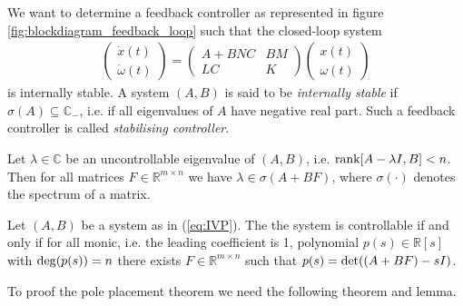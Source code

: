We want to determine a feedback controller as represented in figure \ref{fig:blockdiagram_feedback_loop} such that the closed-loop system
\begin{align*}
	\begin{pmatrix}
	\dot{x}(t) \\
	\dot{\omega}(t)
	\end{pmatrix} =
	\begin{pmatrix}
	A+BNC & BM \\
	LC & K
	\end{pmatrix}
	\begin{pmatrix}
	x(t) \\
	\omega(t)
	\end{pmatrix}
\end{align*}
is internally stable. A system $(A,B)$ is said to be \emph{internally stable} if $\sigma(A) \subseteq \mathbb{C}_-$, i.e. if all eigenvalues of $A$ have negative real part. Such a feedback controller is called \emph{stabilising controller}. 
\begin{mylem}\label{lem:9.1}
	Let $\lambda\in\mathbb{C}$ be an uncontrollable eigenvalue of $(A,B)$, i.e. $\operatorname{rank}[A-\lambda I, B] < n$. Then for all matrices $F \in \mathbb{R}^{m\times n}$ we have $\lambda\in\sigma(A+BF) $, where $\sigma(\cdot)$ denotes the spectrum of a matrix.
\end{mylem}
\begin{mythm}\label{thm:PP}
	Let $(A,B)$ be a system as in (\ref{eq:IVP}). The the system is controllable if and only if for all monic, i.e. the leading coefficient is 1, polynomial $p(s) \in\mathbb{R}[s]$ with $\operatorname{deg}(p(s)) = n$ there exists $F\in\mathbb{R}^{m\times n}$ such that $p(s) = \operatorname{det}((A+BF)-sI)$.
\end{mythm}
\noindent To proof the pole placement theorem we need the following theorem and lemma.
